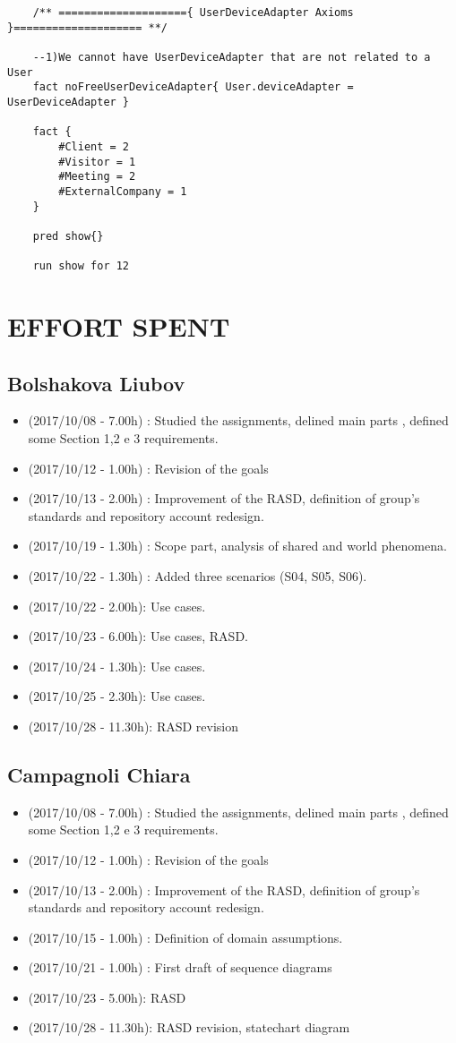 \documentclass[a4paper,leqno]{book}
\begin{document}
\begin{lstlisting}
	/** ===================={ UserDeviceAdapter Axioms }==================== **/
	
	--1)We cannot have UserDeviceAdapter that are not related to a User
	fact noFreeUserDeviceAdapter{ User.deviceAdapter = UserDeviceAdapter }
	
	fact {
		#Client = 2
		#Visitor = 1
		#Meeting = 2
		#ExternalCompany = 1
	}
	
	pred show{}
	
	run show for 12
	\end{lstlisting}


\chapter{EFFORT SPENT}

\section{Bolshakova Liubov}
\begin{itemize}
\item (2017/10/08 - 7.00h) : Studied the assignments, delined main parts , defined some Section 1,2 e 3 requirements.
\item (2017/10/12 - 1.00h) : Revision of the goals 
\item (2017/10/13 - 2.00h) : Improvement of the RASD, definition of group's standards and repository account redesign.
\item (2017/10/19 - 1.30h) : Scope part, analysis of shared and world phenomena.
\item (2017/10/22 - 1.30h) : Added three scenarios (S04, S05, S06).
\item (2017/10/22 - 2.00h): Use cases.
\item (2017/10/23 - 6.00h): Use cases, RASD. 
\item (2017/10/24 - 1.30h): Use cases.
\item (2017/10/25 - 2.30h): Use cases.
\item (2017/10/28 - 11.30h): RASD revision
\end{itemize}

\section{Campagnoli Chiara}
\begin{itemize}
\item (2017/10/08 - 7.00h) : Studied the assignments, delined main parts , defined some Section 1,2 e 3 requirements.
\item (2017/10/12 - 1.00h) : Revision of the goals 
\item (2017/10/13 - 2.00h) : Improvement of the RASD, definition of group's standards and repository account redesign.
\item (2017/10/15 - 1.00h) : Definition of domain assumptions.
\item (2017/10/21 - 1.00h) : First draft of sequence diagrams
\item (2017/10/23 - 5.00h): RASD
\item (2017/10/28 - 11.30h): RASD revision, statechart diagram
\end{itemize}
\end{document}
